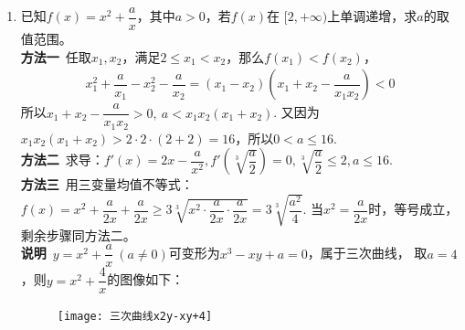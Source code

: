 \begin{enumerate}[label={【\textbf{例\thechapter.\arabic*}】},
 leftmargin=\inteval{\myenumleftmargin}pt,
 itemsep=\inteval{\myenumitempsep}pt,
 itemindent=\inteval{\myenumitemindent}pt]
\item 已知$ f(x)=x^2+\dfrac{a}{x} $，其中$ a>0 $，若$ f(x) $在
$ [2,+\infty) $上单调递增，求$ a $的取值范围。 \\
\textbf{方法一}\ 任取$ x_1,x_2 $，满足$ 2\leq x_1<x_2 $，那么$ f(x_1)<f(x_2) $，
\begin{align*}
    x_1^2+\dfrac{a}{x_1}-x_2^2-\dfrac{a}{x_2} 
    =(x_1-x_2)\left(x_1+x_2-\dfrac{a}{x_1x_2} \right) <0 
\end{align*} 
所以$ x_1+x_2-\dfrac{a}{x_1x_2}>0,\ a<x_1x_2(x_1+x_2) $. 又因为
$ x_1x_2(x_1+x_2)>2\cdot 2 \cdot(2+2)=16 $，所以$ 0<a\leq 16 $. \\
\textbf{方法二}\ 求导：$ f'(x)=2x-\dfrac{a}{x^2},f'\left(\sqrt[3]{
    \dfrac{a}{2}} \right)=0,\sqrt[3]{\dfrac{a}{2}}\leq 2,a\leq 16 $. \\
\textbf{方法三}\ 用三变量均值不等式：$ f(x)=x^2+\dfrac{a}{2x}+\dfrac{a}{2x} 
\geq 3\sqrt[3]{x^2\cdot\dfrac{a}{2x}\cdot\dfrac{a}{2x}}=
3\sqrt[3]{\dfrac{a^2}{4}} $. 当$ x^2=\dfrac{a}{2x} $时，等号成立，
剩余步骤同方法二。 \\
\textbf{说明}\ $ y=x^2+\dfrac{a}{x}\ (a\neq 0) $可变形为$ x^3-xy+a=0 $，属于三次曲线，
取$ a=4 $，则$ y=x^2+\dfrac{4}{x} $的图像如下：\\
\begin{figure}[h] %
    \centering
    \texttt{[image: 三次曲线x2y-xy+4]}
\end{figure} 


\end{enumerate}
